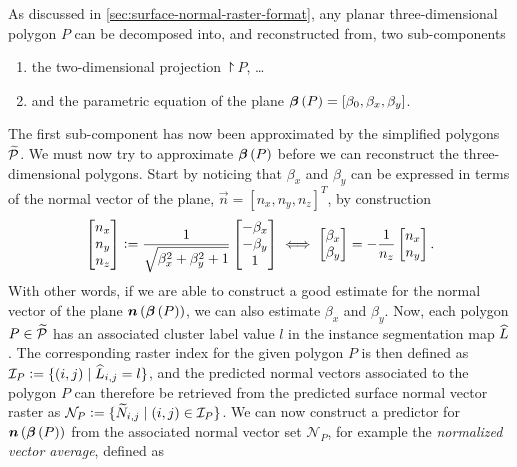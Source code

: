As discussed in \cref{sec:surface-normal-raster-format}, any planar three-dimensional polygon $P$ can be decomposed into, and reconstructed from, two sub-components
\begin{enumerate}[nosep]
  \item the two-dimensional projection $\project{P}$, \dots
  \item and the parametric equation of the plane $\boldsymbol{\beta}\left(P\right) = [\beta_0, \beta_x, \beta_y]$.
\end{enumerate}
The first sub-component has now been approximated by the simplified polygons $\widetilde{\mathcal{P}}$.
We must now try to approximate $\boldsymbol{\beta}\left(P\right)$ before we can reconstruct the three-dimensional polygons.
Start by noticing that $\beta_x$ and $\beta_y$ can be expressed in terms of the normal vector of the plane, $\vec{n} = {[n_x, n_y, n_z]}^T$, by construction
\begin{equation*}
  \begin{bmatrix}
    n_x\\
    n_y\\
    n_z
  \end{bmatrix}
  \vcentcolon=
  \frac{1}{\sqrt{\beta_x^2 + \beta_y^2 + 1}}
  \begin{bmatrix}
    -\beta_x\\
    -\beta_y\\
    1
  \end{bmatrix}
  \iff
  \begin{bmatrix}
    \beta_x\\
    \beta_y
  \end{bmatrix}
  =
  -\frac{1}{n_z}
  \begin{bmatrix}
    n_x\\
    n_y
  \end{bmatrix}.
\end{equation*}
With other words, if we are able to construct a good estimate for the normal vector of the plane $\boldsymbol{n}\left(\boldsymbol{\beta}\left(P\right)\right)$, we can also estimate $\beta_x$ and $\beta_y$.
Now, each polygon $P \in \widetilde{\mathcal{P}}$ has an associated cluster label value $l$ in the instance segmentation map $\widehat{L}$.
The corresponding raster index for the given polygon $P$ is then defined as $\mathcal{I}_P \vcentcolon= \{(i, j) \mid \widehat{L}_{i,j} = l \}$, and the predicted normal vectors associated to the polygon $P$ can therefore be retrieved from the predicted surface normal vector raster as $\mathcal{N}_{P} \vcentcolon= \{\widetilde{N}_{i,j} \mid (i,j) \in \mathcal{I}_P \}$.
We can now construct a predictor for $\boldsymbol{n}\left(\boldsymbol{\beta}\left(P\right)\right)$ from the associated normal vector set $\mathcal{N}_P$, for example the \textit{normalized vector average}, defined as
